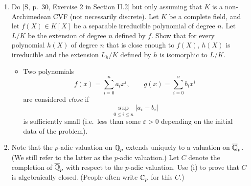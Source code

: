 \documentclass[12pt]{article}  %
\begin{document}
\begin{problem}[2]
\begin{enumerate}
    \item Do [S, p.~30, Exercise 2 in Section II.2] but only assuming that $K$ is a non-Archimedean CVF (not necessarily discrete). Let $K$ be a complete field, and let $f(X) \in K[X]$ be a separable irreducible polynomial of degree $n$. Let $L/K$ be the extension of degree $n$ defined by $f$. Show that for every polynomial $h(X)$ of degree $n$ that is close enough to $f(X)$, $h(X)$ is irreducible and the extension $L_h/K$ defined by $h$ is isomorphic to $L/K$.

    \begin{itemize}
        \item Two polynomials 
        \[
            f(x) = \sum_{i=0}^n a_i x^i, 
            \qquad 
            g(x) = \sum_{i=0}^n b_i x^i
        \]
        are considered \emph{close} if 
        \[
            \sup_{0 \le i \le n} |a_i - b_i|
        \]
        is sufficiently small (i.e.\ less than some $\varepsilon > 0$ depending on the initial data of the problem).
    \end{itemize}

    \item Note that the $p$-adic valuation on $\mathbb{Q}_p$ extends uniquely to a valuation on $\overline{\mathbb{Q}}_p$.
    (We still refer to the latter as the $p$-adic valuation.)
    Let $C$ denote the completion of $\overline{\mathbb{Q}}_p$ with respect to the $p$-adic valuation.
    Use (i) to prove that $C$ is algebraically closed.
    (People often write $\mathbb{C}_p$ for this $C$.)
\end{enumerate}
\end{problem}
\end{document}
